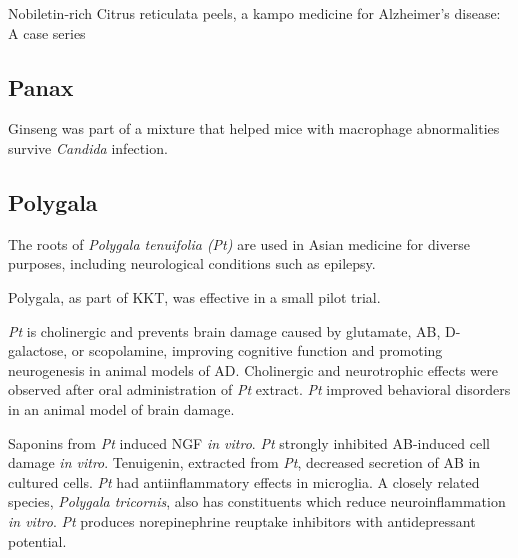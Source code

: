 Nobiletin-rich Citrus reticulata peels,
a kampo medicine for Alzheimer's disease: A case series
\cite{seki2013nobiletin}


\subsection{Panax}

Ginseng was part of a mixture that
helped mice with macrophage abnormalities
survive \textit{Candida} infection.
\cite{akagawa1996protection}







\subsection{Polygala}

The roots of \textit{Polygala tenuifolia (Pt)} are used in Asian medicine
for diverse purposes, including neurological conditions such as epilepsy.

Polygala, as part of KKT, was effective in a small pilot trial.
\cite{arai2015effectiveness}



\textit{Pt} is cholinergic and prevents brain
damage caused by glutamate, AB, D-galactose, or scopolamine,
improving cognitive function and promoting neurogenesis
in animal models of AD.
\cite{park2002novel,
zhang2006effect,
sun2007effect,
zeng2009effect,
wen2010study,
shi2011effects}
Cholinergic and neurotrophic effects were observed
after oral administration of \textit{Pt} extract.
\cite{yabe1997enhancements}
\textit{Pt} improved behavioral disorders in an animal model
of brain damage.
\cite{chen2004effect}

Saponins from \textit{Pt} induced NGF \textit{in vitro}.
\cite{yabe2003induction}
\textit{Pt} strongly inhibited AB-induced cell damage \textit{in vitro}.
\cite{naito2006characterization}
Tenuigenin, extracted from \textit{Pt},
decreased secretion of AB in cultured cells.
\cite{jia2004tenuigenin}
\textit{Pt} had antiinflammatory effects in microglia.
\cite{cheong2011anti}
A closely related species, \textit{Polygala tricornis},
also has constituents which reduce
neuroinflammation \textit{in vitro}.
\cite{li2012anti}
\textit{Pt} produces norepinephrine reuptake inhibitors
with antidepressant potential.
\cite{cheng2006antidepressant}

